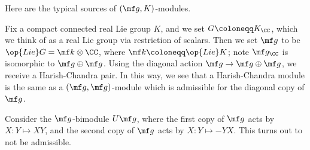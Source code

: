 \documentclass[../notes.tex]{subfiles}
\begin{document}
Here are the typical sources of $(\mf g,K)$-modules.
\begin{example}
	Fix a compact connected real Lie group $K$, and we set $G\coloneqq K_\CC$, which we think of as a real Lie group via restriction of scalars. Then we set $\mf g$ to be $\op{Lie}G=\mf k\otimes\CC$, where $\mf k\coloneqq\op{Lie}K$; note $\mf g_\CC$ is isomorphic to $\mf g\oplus\mf g$. Using the diagonal action $\mf g\to\mf g\oplus\mf g$, we receive a Harish-Chandra pair. In this way, we see that a Harish-Chandra module is the same as a $(\mf g,\mf g)$-module which is admissible for the diagonal copy of $\mf g$.
\end{example}
\begin{example}
	Consider the $\mf g$-bimodule $U\mf g$, where the first copy of $\mf g$ acts by $X\colon Y\mapsto XY$, and the second copy of $\mf g$ acts by $X\colon Y\mapsto-YX$. This turns out to not be admissible.
\end{example}
\end{document}
